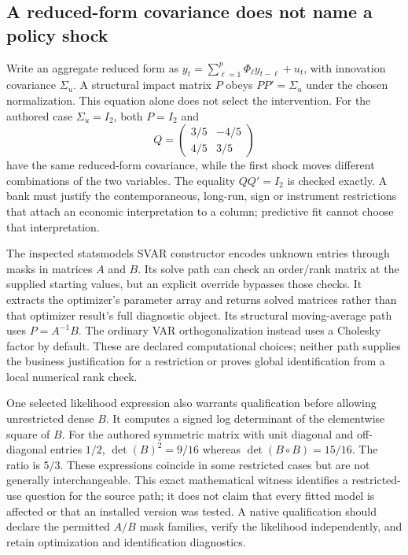 \subsection{A reduced-form covariance does not name a policy shock}

Write an aggregate reduced form as $y_t=\sum_{\ell=1}^p\Phi_\ell y_{t-\ell}+u_t$, with innovation covariance $\Sigma_u$. A structural impact matrix $P$ obeys $PP'=\Sigma_u$ under the chosen normalization. This equation alone does not select the intervention. For the authored case $\Sigma_u=I_2$, both $P=I_2$ and
\[
 Q=\begin{pmatrix}3/5&-4/5\\4/5&3/5\end{pmatrix}
\]
have the same reduced-form covariance, while the first shock moves different combinations of the two variables. The equality $QQ'=I_2$ is checked exactly. A bank must justify the contemporaneous, long-run, sign or instrument restrictions that attach an economic interpretation to a column; predictive fit cannot choose that interpretation.~\citep{exec25_pydyn_choice}

The inspected statsmodels SVAR constructor encodes unknown entries through masks in matrices $A$ and $B$. Its solve path can check an order/rank matrix at the supplied starting values, but an explicit override bypasses those checks. It extracts the optimizer's parameter array and returns solved matrices rather than that optimizer result's full diagnostic object. Its structural moving-average path uses $P=A^{-1}B$. The ordinary VAR orthogonalization instead uses a Cholesky factor by default. These are declared computational choices; neither path supplies the business justification for a restriction or proves global identification from a local numerical rank check.~\citep{exec25_pydyn_statsmodels}

One selected likelihood expression also warrants qualification before allowing unrestricted dense $B$. It computes a signed log determinant of the elementwise square of $B$. For the authored symmetric matrix with unit diagonal and off-diagonal entries $1/2$, $\det(B)^2=9/16$ whereas $\det(B\circ B)=15/16$. The ratio is $5/3$. These expressions coincide in some restricted cases but are not generally interchangeable. This exact mathematical witness identifies a restricted-use question for the source path; it does not claim that every fitted model is affected or that an installed version was tested. A native qualification should declare the permitted $A/B$ mask families, verify the likelihood independently, and retain optimization and identification diagnostics.~\citep{exec25_pydyn_statsmodels,exec25_pydyn_choice}

